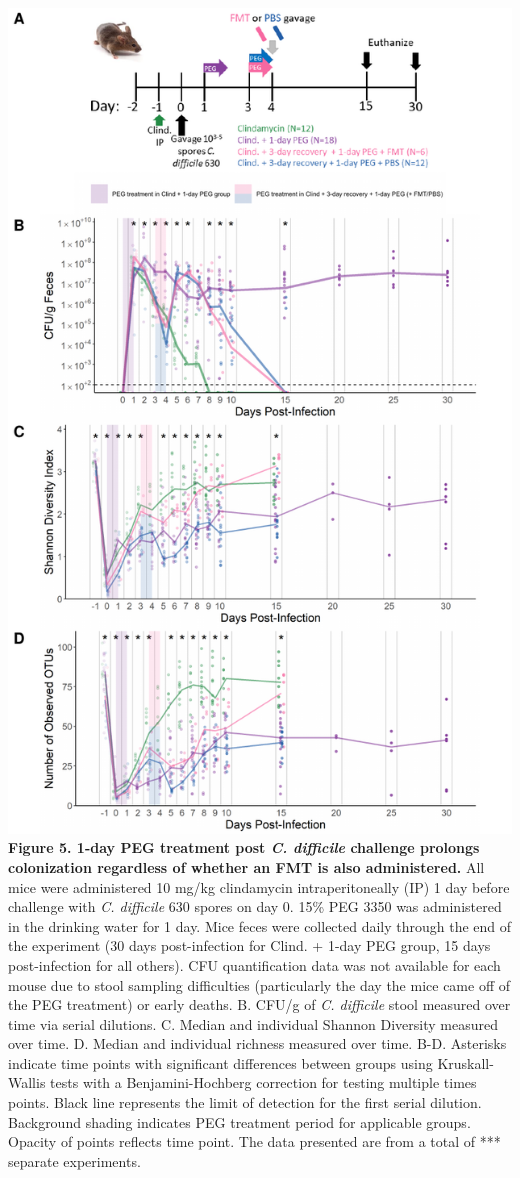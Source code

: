 \documentclass[
  11pt,
]{article}
\begin{document}
\includegraphics{figure_5.pdf} \textbf{Figure 5. 1-day PEG treatment
post \emph{C. difficile} challenge prolongs colonization regardless of
whether an FMT is also administered.} All mice were administered 10
mg/kg clindamycin intraperitoneally (IP) 1 day before challenge with
\emph{C. difficile} 630 spores on day 0. 15\% PEG 3350 was administered
in the drinking water for 1 day. Mice feces were collected daily through
the end of the experiment (30 days post-infection for Clind. + 1-day PEG
group, 15 days post-infection for all others). CFU quantification data
was not available for each mouse due to stool sampling difficulties
(particularly the day the mice came off of the PEG treatment) or early
deaths. B. CFU/g of \emph{C. difficile} stool measured over time via
serial dilutions. C. Median and individual Shannon Diversity measured
over time. D. Median and individual richness measured over time. B-D.
Asterisks indicate time points with significant differences between
groups using Kruskall-Wallis tests with a Benjamini-Hochberg correction
for testing multiple times points. Black line represents the limit of
detection for the first serial dilution. Background shading indicates
PEG treatment period for applicable groups. Opacity of points reflects
time point. The data presented are from a total of *** separate
experiments. \newpage
\end{document}
